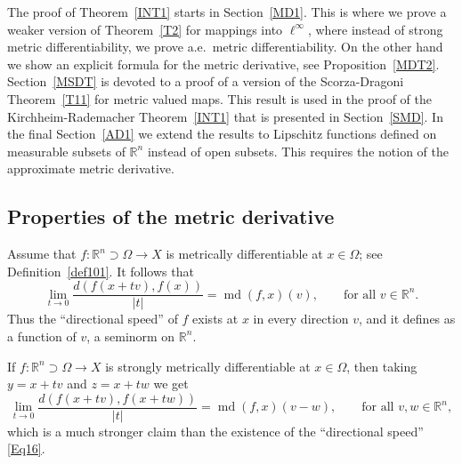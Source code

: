 \documentclass[12pt,leqno]{amsart}
\theoremstyle{definition}
\newtheorem{remark}[theorem]{Remark}
\newcommand{\bbbr}{\mathbb R}
\def\md{\operatorname{md}}
\numberwithin{theorem}{section} \numberwithin{equation}{section}
\begin{document}
The proof of Theorem~\ref{INT1} starts in Section~\ref{MD1}. This is where we prove a weaker version of Theorem~\ref{T2} for mappings into $\ell^\infty$, where instead of strong metric differentiability, we prove a.e.\ metric differentiability. On the other hand we show an explicit formula for the metric derivative, see Proposition~\ref{MDT2}. Section~\ref{MSDT} is devoted to a proof of a version of the Scorza-Dragoni Theorem~\ref{T11} for metric valued maps. This result is used in the proof of the Kirchheim-Rademacher Theorem~\ref{INT1} that is presented in Section~\ref{SMD}. In the final Section~\ref{AD1} we extend the results to Lipschitz functions defined on measurable subsets of $\bbbr^n$ instead of open subsets. This requires the notion of the approximate metric derivative.





\subsection{Properties of the metric derivative}
\label{PMD}
Assume that $f:\bbbr^n\supset\Omega\to X$ is metrically differentiable at $x\in\Omega$; see Definition~\ref{def101}.
It follows that
\begin{equation}
\label{Eq16}
\lim_{t\to 0}\frac{d(f(x+tv),f(x))}{|t|}=\md (f,x)(v),
\qquad
\text{for all } v\in\bbbr^n.
\end{equation}
Thus the ``directional speed'' of $f$ exists at $x$ in every direction $v$, and it defines as a function of $v$, a seminorm on $\bbbr^n$.

If $f:\bbbr^n\supset\Omega\to X$ is strongly metrically differentiable at $x\in\Omega$, then taking $y=x+tv$ and $z=x+tw$ we get
\[
\lim_{t\to 0} \frac{d(f(x+tv),f(x+tw))}{|t|}=\md(f,x)(v-w),
\qquad
\text{for all } v,w\in\bbbr^n,
\]
which is a much stronger claim than the existence of the ``directional speed'' \eqref{Eq16}.
\end{document}
